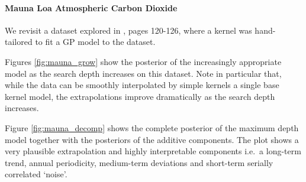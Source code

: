 \documentclass[twoside]{article}
\begin{document}

\paragraph{Mauna Loa Atmospheric Carbon Dioxide}

We revisit a dataset explored in \cite{rasmussen38gaussian}, pages 120-126, where a kernel was hand-tailored to fit a GP model to the dataset.

Figures \ref{fig:mauna_grow} show the posterior of the increasingly appropriate model as the search depth increases on this dataset.
Note in particular that, while the data can be smoothly interpolated by simple kernels a single base kernel model, the extrapolations improve dramatically as the search depth increases.

Figure \ref{fig:mauna_decomp} shows the complete posterior of the maximum depth model together with the posteriors of the additive components.
The plot shows a very plausible extrapolation and highly interpretable components i.e.~a long-term trend, annual periodicity, medium-term deviations and short-term serially correlated `noise'.
\end{document}
